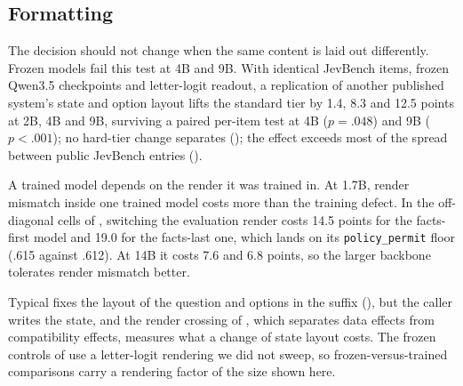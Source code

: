 \subsection{Formatting}
\label{sec:results:rendering}

The decision should not change when the same content is laid out differently. Frozen models fail this
test at 4B and 9B. With identical
JevBench items, frozen Qwen3.5 checkpoints and letter-logit readout, a replication of another published
system's state and option layout lifts the standard tier by 1.4, 8.3 and 12.5 points at 2B, 4B and 9B,
surviving a paired per-item test at 4B ($p = .048$) and 9B ($p < .001$); no hard-tier change separates
(); the effect exceeds most of the spread between public JevBench entries
().

A trained model depends on the render it was trained in. At 1.7B,
render mismatch inside one trained model costs more than the training defect. In the off-diagonal cells
of , switching the evaluation render costs 14.5 points for the facts-first model and
19.0 for the facts-last one, which lands on its \texttt{policy\_permit} floor (.615 against .612). At
14B it costs 7.6 and 6.8 points, so the larger backbone tolerates render mismatch better.

Typical fixes the layout of the question and options in the suffix (), but the
caller writes the state, and the render crossing of , which separates data
effects from compatibility effects, measures what a change of state layout costs. The frozen controls of  use a
letter-logit rendering we did not sweep, so frozen-versus-trained comparisons carry a rendering factor of
the size shown here.
